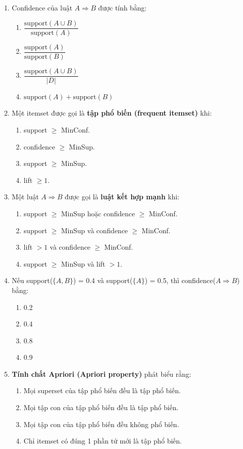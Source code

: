 \documentclass[10pt]{article}
\begin{document}
\begin{enumerate}[leftmargin=*, label=\textbf{Câu \arabic*.}]
    \item Confidence của luật $A \Rightarrow B$ được tính bằng:
    \begin{enumerate}[label=\Alph*.]
        \item $\dfrac{\text{support}(A \cup B)}{\text{support}(A)}$
        \item $\dfrac{\text{support}(A)}{\text{support}(B)}$
        \item $\dfrac{\text{support}(A \cup B)}{|D|}$
        \item $\text{support}(A) + \text{support}(B)$
    \end{enumerate}

    \item Một itemset được gọi là \textbf{tập phổ biến (frequent itemset)} khi:
    \begin{enumerate}[label=\Alph*.]
        \item support $\geq$ MinConf.
        \item confidence $\geq$ MinSup.
        \item support $\geq$ MinSup.
        \item lift $\geq 1$.
    \end{enumerate}

    \item Một luật $A \Rightarrow B$ được gọi là \textbf{luật kết hợp mạnh} khi:
    \begin{enumerate}[label=\Alph*.]
        \item support $\geq$ MinSup hoặc confidence $\geq$ MinConf.
        \item support $\geq$ MinSup và confidence $\geq$ MinConf.
        \item lift $> 1$ và confidence $\geq$ MinConf.
        \item support $\geq$ MinSup và lift $> 1$.
    \end{enumerate}

    \item Nếu support($\{A,B\}$) = 0.4 và support($\{A\}$) = 0.5, thì confidence($A \Rightarrow B$) bằng:
    \begin{enumerate}[label=\Alph*.]
        \item 0.2
        \item 0.4
        \item 0.8
        \item 0.9
    \end{enumerate}

    \item \textbf{Tính chất Apriori (Apriori property)} phát biểu rằng:
    \begin{enumerate}[label=\Alph*.]
        \item Mọi superset của tập phổ biến đều là tập phổ biến.
        \item Mọi tập con của tập phổ biến đều là tập phổ biến.
        \item Mọi tập con của tập phổ biến đều không phổ biến.
        \item Chỉ itemset có đúng 1 phần tử mới là tập phổ biến.
    \end{enumerate}


\end{enumerate}
\end{document}
